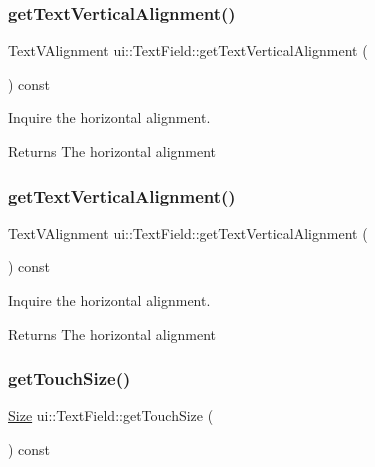 \subsubsection{\texorpdfstring{get\+Text\+Vertical\+Alignment()}{getTextVerticalAlignment()}\hspace{0.1cm}{\footnotesize\ttfamily [1/2]}}
{\footnotesize\ttfamily Text\+V\+Alignment ui\+::\+Text\+Field\+::get\+Text\+Vertical\+Alignment (\begin{DoxyParamCaption}{ }\end{DoxyParamCaption}) const}



Inquire the horizontal alignment. 

\begin{DoxyReturn}{Returns}
The horizontal alignment 
\end{DoxyReturn}
\mbox{\label{classui_1_1TextField_a79228941a990932f6af8d07268f5a5e7}} 
\subsubsection{\texorpdfstring{get\+Text\+Vertical\+Alignment()}{getTextVerticalAlignment()}\hspace{0.1cm}{\footnotesize\ttfamily [2/2]}}
{\footnotesize\ttfamily Text\+V\+Alignment ui\+::\+Text\+Field\+::get\+Text\+Vertical\+Alignment (\begin{DoxyParamCaption}{ }\end{DoxyParamCaption}) const}



Inquire the horizontal alignment. 

\begin{DoxyReturn}{Returns}
The horizontal alignment 
\end{DoxyReturn}
\mbox{\label{classui_1_1TextField_a4aee73c65ff1fcf04d2049ff9ac5c050}} 
\subsubsection{\texorpdfstring{get\+Touch\+Size()}{getTouchSize()}\hspace{0.1cm}{\footnotesize\ttfamily [1/2]}}
{\footnotesize\ttfamily \hyperlink{classSize}{Size} ui\+::\+Text\+Field\+::get\+Touch\+Size (\begin{DoxyParamCaption}{ }\end{DoxyParamCaption}) const}



